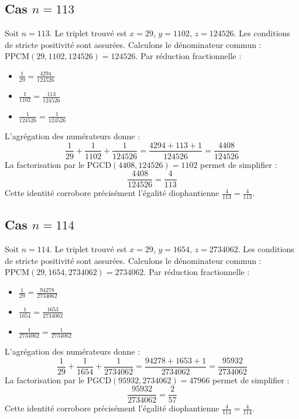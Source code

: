 \documentclass[11pt,a4paper]{article}
\begin{document}
\subsection{Cas $n = 113$}
Soit $n = 113$. Le triplet trouvé est $x = 29$, $y = 1102$, $z = 124526$.
Les conditions de stricte positivité sont assurées.
Calculons le dénominateur commun : $\text{PPCM}(29, 1102, 124526) = 124526$.
Par réduction fractionnelle :
\begin{itemize}
    \item $\frac{1}{29} = \frac{4294}{124526}$
    \item $\frac{1}{1102} = \frac{113}{124526}$
    \item $\frac{1}{124526} = \frac{1}{124526}$
\end{itemize}
L'agrégation des numérateurs donne :
$$ \frac{1}{29} + \frac{1}{1102} + \frac{1}{124526} = \frac{4294 + 113 + 1}{124526} = \frac{4408}{124526} $$
La factorisation par le $\text{PGCD}(4408, 124526) = 1102$ permet de simplifier :
$$ \frac{4408}{124526} = \frac{4}{113} $$
Cette identité corrobore précisément l'égalité diophantienne $\frac{4}{113} = \frac{4}{113}$.

\subsection{Cas $n = 114$}
Soit $n = 114$. Le triplet trouvé est $x = 29$, $y = 1654$, $z = 2734062$.
Les conditions de stricte positivité sont assurées.
Calculons le dénominateur commun : $\text{PPCM}(29, 1654, 2734062) = 2734062$.
Par réduction fractionnelle :
\begin{itemize}
    \item $\frac{1}{29} = \frac{94278}{2734062}$
    \item $\frac{1}{1654} = \frac{1653}{2734062}$
    \item $\frac{1}{2734062} = \frac{1}{2734062}$
\end{itemize}
L'agrégation des numérateurs donne :
$$ \frac{1}{29} + \frac{1}{1654} + \frac{1}{2734062} = \frac{94278 + 1653 + 1}{2734062} = \frac{95932}{2734062} $$
La factorisation par le $\text{PGCD}(95932, 2734062) = 47966$ permet de simplifier :
$$ \frac{95932}{2734062} = \frac{2}{57} $$
Cette identité corrobore précisément l'égalité diophantienne $\frac{4}{114} = \frac{4}{114}$.
\end{document}
